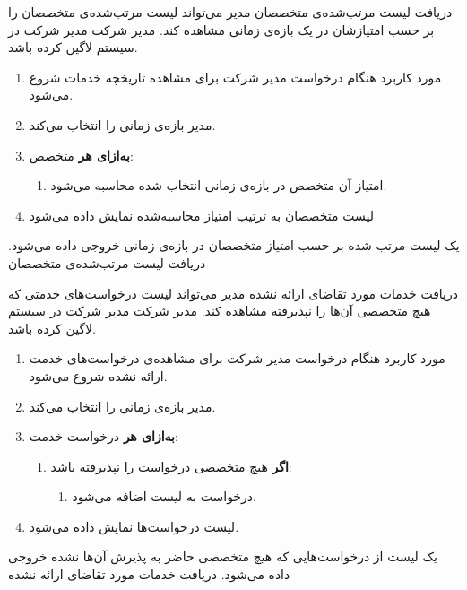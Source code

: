 {
\usecase
{دریافت لیست مرتب‌شده‌ی متخصصان}
{}
{مدیر می‌تواند لیست مرتب‌شده‌ی متخصصان را بر حسب امتیازشان در یک بازه‌ی زمانی مشاهده کند.}
{مدیر شرکت}
{}
{مدیر شرکت در سیستم لاگین کرده باشد.}
{
	\vspace*{-0.6cm}
	\begin{enumerate}
		\item 
		مورد کاربرد هنگام درخواست مدیر شرکت برای مشاهده تاریخچه خدمات شروع می‌شود.
		\item
		مدیر بازه‌ی زمانی را انتخاب می‌کند.
		\item
		\textbf{به‌ازای هر} متخصص:
		\begin{enumerate}[label=\theenumi.\arabic*.]
			\item امتیاز آن متخصص در بازه‌ی زمانی انتخاب شده محاسبه می‌شود.
		\end{enumerate}
		\item
		لیست متخصصان به ترتیب امتیاز محاسبه‌شده نمایش داده می‌شود
	\end{enumerate}
}
{یک لیست مرتب شده بر حسب امتیاز متخصصان در بازه‌ی زمانی خروجی داده می‌شود.}
{
}
{
	دریافت لیست مرتب‌شده‌ی متخصصان
}
}

{
\usecase
{دریافت خدمات مورد تقاضای ارائه نشده}
{}
{مدیر می‌تواند لیست درخواست‌های خدمتی که هیچ متخصصی آن‌ها را نپذیرفته مشاهده کند.}
{مدیر شرکت}
{}
{مدیر شرکت در سیستم لاگین کرده باشد.}
{
	\vspace*{-0.6cm}
	\begin{enumerate}
		\item 
		مورد کاربرد هنگام درخواست مدیر شرکت برای مشاهده‌ی درخواست‌های خدمت ارائه نشده شروع می‌شود.
		\item
		مدیر بازه‌ی زمانی را انتخاب می‌کند.
		\item
		\textbf{به‌ازای هر} درخواست خدمت:
		\begin{enumerate}[label=\theenumi.\arabic*.]
			\item 
			\textbf{اگر} هیچ متخصصی درخواست را نپذیرفته باشد:
			\begin{enumerate}
				\item 
				درخواست به لیست اضافه می‌شود.
			\end{enumerate}
		\end{enumerate}
		\item
		لیست درخواست‌ها نمایش داده می‌شود.
	\end{enumerate}
}
{یک لیست از درخواست‌هایی که هیچ متخصصی حاضر به پذیرش آن‌ها نشده خروجی داده می‌شود.}
{
}
{
	دریافت خدمات مورد تقاضای ارائه نشده
}
}

